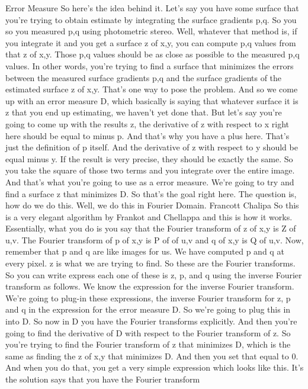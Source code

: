\documentclass[12pt]{article}
\begin{document}
Error Measure
So here's the idea behind it.
Let's say you have some surface that you're trying to obtain
estimate by integrating the surface gradients p,q.
So you so you measured p,q using photometric stereo.
Well, whatever that method is, if you integrate it and you get
a surface z of x,y, you can compute p,q values from that z
of x,y.
Those p,q values should be as close as possible
to the measured p,q values.
In other words, you're trying to find a surface that minimizes
the errors between the measured surface gradients p,q
and the surface gradients of the estimated surface z of x,y.
That's one way to pose the problem.
And so we come up with an error measure D, which basically
is saying that whatever surface it is z that you end up estimating,
we haven't yet done that.
But let's say you're going to come up with the results z,
the derivative of z with respect to x right here
should be equal to minus p.
And that's why you have a plus here.
That's just the definition of p itself.
And the derivative of z with respect to y
should be equal minus y.
If the result is very precise, they
should be exactly the same.
So you take the square of those two terms
and you integrate over the entire image.
And that's what you're going to use as a error measure.
We're going to try and find a surface z that minimizes D.
So that's the goal right here.
The question is, how do we do this.
Well, we do this in Fourier Domain.
Francott Chalipa
So this is a very elegant algorithm
by Frankot and Chellappa and this is how it works.
Essentially, what you do is you say that the Fourier transform
of z of x,y is Z of u,v. The Fourier transform of p of x,y
is P of of u,v and q of x,y is Q of u,v.
Now, remember that p and q are like images for us.
We have computed p and q at every pixel.
z is what we are trying to find.
So these are the Fourier transforms.
So you can write express each one of these
is z, p, and q using the inverse Fourier transform as follows.
We know the expression for the inverse Fourier transform.
We're going to plug-in these expressions,
the inverse Fourier transform for z, p and q
in the expression for the error measure D.
So we're going to plug this in into D.
So now in D you have the Fourier transforms explicitly.
And then you're going to find the derivative of D
with respect to the Fourier transform of z.
So you're trying to find the Fourier transform of z that
minimizes D, which is the same as finding the z of x,y that
minimizes D. And then you set that equal to 0.
And when you do that, you get a very simple expression
which looks like this.
It's the solution says that you have the Fourier transform
\end{document}
